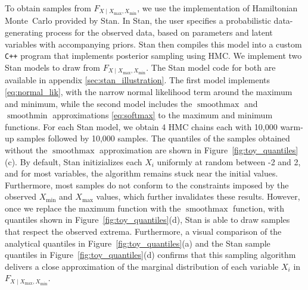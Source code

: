 \documentclass[letter]{article}
\DeclareMathOperator*{\softmax}{smoothmax}
\DeclareMathOperator*{\softmin}{smoothmin}
\newcommand{\Xmax}{X_{\max}}
\newcommand{\Xmin}{X_{\min}}
\newcommand{\Fcond}{F_{X \mid \Xmax,\Xmin}}
\begin{document}
        To obtain samples from \(\Fcond\), we use the implementation of Hamiltonian Monte~Carlo provided by Stan.
In Stan, the user specifies a probabilistic data-generating process for the observed data, based on parameters and latent variables with accompanying priors.
Stan then compiles this model into a custom \texttt{C++} program that implements
posterior sampling using HMC.
We implement two Stan models to draw from \(\Fcond\).
The Stan model code for both are available in appendix \ref{sec:stan_illustration}.
The first model implements \eqref{eq:normal_lik},
with the narrow normal likelihood term around the maximum and minimum,
while the second model includes the \(\softmax\) and \(\softmin\) approximations \eqref{eq:softmax} to the maximum and minimum functions.
For each Stan model, we obtain 4 HMC chains each with 10,000 warm-up samples followed by 10,000 samples.
The quantiles of the samples obtained without the \(\softmax\) approximation are shown in Figure~\ref{fig:toy_quantiles}(c).
By default, Stan initizializes each \(X_i\) uniformly at random between -2 and 2,
and for most variables, the algorithm remains stuck near the initial values.
Furthermore, most samples do not conform to the constraints imposed by the observed \(\Xmin\) and \(\Xmax\) values, which further invalidates these results.
However, once we replace the maximum function with the \(\softmax\) function,
with quantiles shown in Figure~\ref{fig:toy_quantiles}(d),
Stan is able to draw samples that respect the observed extrema.
Furthermore, a visual comparison of the analytical quantiles in Figure~\ref{fig:toy_quantiles}(a)
and the Stan sample quantiles in Figure~\ref{fig:toy_quantiles}(d) confirms that
this sampling algorithm delivers a close approximation of the marginal distribution of each variable \(X_i\) in \(\Fcond\).
    
\end{document}

